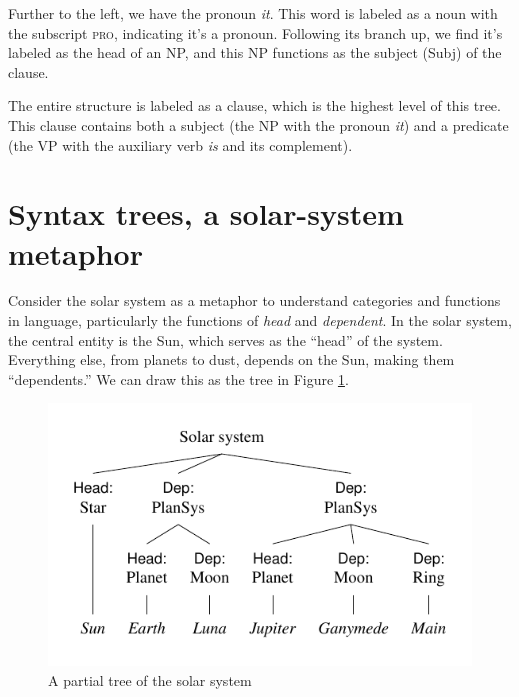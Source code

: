 Further to the left, we have the pronoun \textit{it}. This word is labeled as a noun with the subscript \textsc{pro}, indicating it's a pronoun. Following its branch up, we find it's labeled as the head of an NP, and this NP functions as the subject (Subj) of the clause.

The entire structure is labeled as a clause, which is the highest level of this tree. This clause contains both a subject (the NP with the pronoun \textit{it}) and a predicate (the VP with the auxiliary verb \textit{is} and its complement).

\section{Syntax trees, a solar-system metaphor}\label{sec:trees}

Consider the solar system as a metaphor to understand categories and functions in language, particularly the functions of \textit{head} and \textit{dependent}. In the solar system, the central entity is the Sun, which serves as the ``head'' of the system. Everything else, from planets to dust, depends on the Sun, making them ``dependents.'' We can draw this as the tree in Figure \ref{fig:solarsys}.

\begin{figure}
  \centering
  \includegraphics{figures/solarsys.pdf}
  \caption{A partial tree of the solar system}
  \label{fig:solarsys}
\end{figure}

